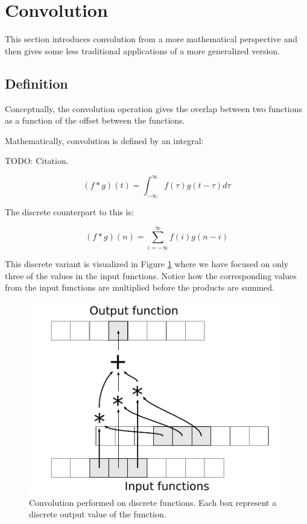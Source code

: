 \section{Convolution}
This section introduces convolution from a more mathematical perspective and then gives some less traditional applications of a more generalized version.

\subsection{Definition}
Conceptually, the convolution operation gives the overlap between two functions as a function of the offset between the functions.

Mathematically, convolution is defined by an integral:

TODO: Citation.

\[
    (f * g)(t) = \int^{\infty}_{-\infty}{f(\tau)g(t-\tau) d\tau}
\]

The discrete counterpart to this is:

\[
    (f * g)(n) = \sum^{\infty}_{i=-\infty}{f(i)g(n-i)}
\]

This discrete variant is visualized in Figure \ref{fig:VisualConvolution} where we have focused on only three of the values in the input functions.
Notice how the corresponding values from the input functions are multiplied before the products are summed.

\begin{figure}
    \centering
    \includegraphics{img/VisualConvolution}
    \caption{
        Convolution performed on discrete functions.
        Each box represent a discrete output value of the function.
    }
    \label{fig:VisualConvolution}
\end{figure}

